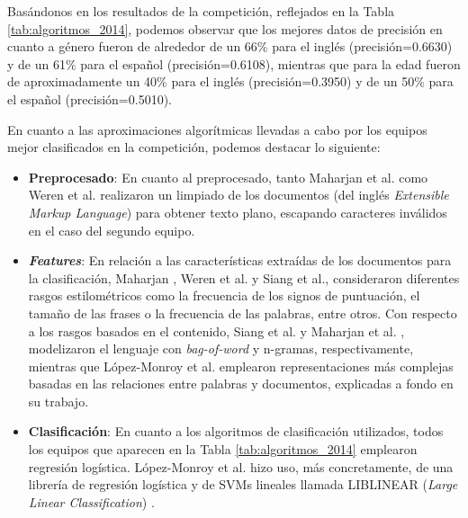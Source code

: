 Basándonos en los resultados de la competición, reflejados en la Tabla \ref{tab:algoritmos_2014}, podemos observar que los mejores datos de precisión
en cuanto a género fueron de alrededor de un 66\% para el inglés (precisión=0.6630) y de un 61\% para el español (precisión=0.6108), mientras que para la edad fueron de aproximadamente un 40\% para el inglés
(precisión=0.3950) y de un 50\% para el español (precisión=0.5010).

\bigskip
En cuanto a las aproximaciones algorítmicas llevadas a cabo por los equipos mejor clasificados en la competición, podemos destacar lo siguiente:

\begin{itemize}
	\item \textbf{Preprocesado}: En cuanto al preprocesado, tanto Maharjan et al. \cite{maharjan2014simple} como Weren et al. \cite{weren2014exploring} realizaron un limpiado de los documentos
	      (del inglés \textit{Extensible Markup Language}) para obtener texto plano, escapando caracteres inválidos en el caso del segundo equipo.
	\item \textbf{\textit{Features}}: En relación a las características extraídas de los documentos para la clasificación, Maharjan \cite{maharjan2014simple}, Weren et al. \cite{weren2014exploring} y Siang et al.,
	      consideraron diferentes rasgos estilométricos como la frecuencia de los signos de puntuación, el tamaño de las frases o la frecuencia de las palabras, entre otros. Con respecto
	      a los rasgos basados en el contenido, Siang et al. y Maharjan et al. \cite{maharjan2014simple}, modelizaron el lenguaje con \textit{bag-of-word} y n-gramas, respectivamente, mientras
	      que López-Monroy et al. \cite{lopez2014using} emplearon representaciones más complejas basadas en las relaciones entre palabras y documentos, explicadas a fondo
	      en su trabajo.
	\item \textbf{Clasificación}: En cuanto a los algoritmos de clasificación utilizados, todos los equipos que aparecen en la Tabla \ref{tab:algoritmos_2014} emplearon regresión logística. López-Monroy et al. \cite{lopez2014using}
	      hizo uso, más concretamente, de una librería de regresión logística y de SVMs lineales llamada LIBLINEAR (\textit{Large Linear Classification}) \cite{fan2008liblinear}.
\end{itemize}

